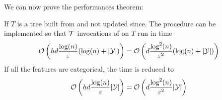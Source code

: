 We can now prove the performances theorem:
\begin{theorem}\label{th:update_time_complexity}
    If $T$ is a tree built from \AlgoBuild{} and not updated since. The \AlgoUpdate{} procedure can be implemented so that $\mathcal{T}$ invocations of \AlgoUpdate{} on $T$ run in time
    \begin{equation}\label{eq:time_complexity_update_num}
        \mathcal{O}\left(hd\frac{\log(n)}{\varepsilon}(\log(n) + |\mathcal{Y}|)\right) = \mathcal{O}\left(d\frac{\log^2(n)}{\varepsilon^2}(\log(n) + |\mathcal{Y}|)\right)
    \end{equation}
    If all the features are categorical, the time is reduced to
    \begin{equation}\label{eq:time_complexity_update_cat}
        \mathcal{O}\left(hd\frac{\log(n)}{\varepsilon}|\mathcal{Y}|\right) = \mathcal{O}\left(d\frac{\log^2(n)}{\varepsilon^2} |\mathcal{Y}|\right)
    \end{equation}
\end{theorem}
